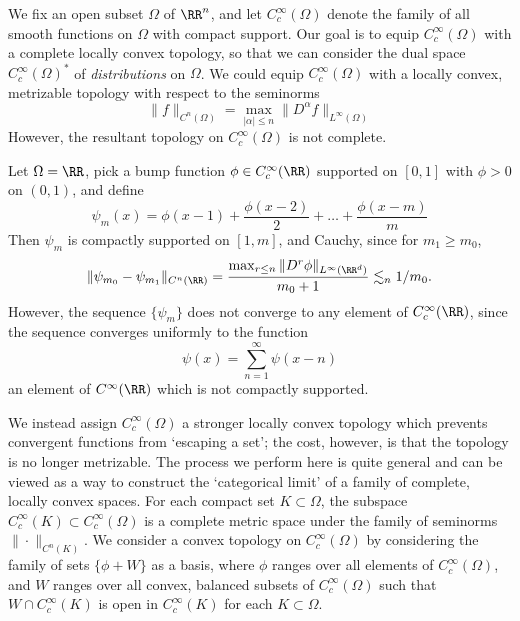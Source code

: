 We fix an open subset $\Omega$ of $\RR^n$, and let $C_c^\infty(\Omega)$ denote the family of all smooth functions on $\Omega$ with compact support. Our goal is to equip $C_c^\infty(\Omega)$ with a complete locally convex topology, so that we can consider the dual space $C_c^\infty(\Omega)^*$ of \emph{distributions} on $\Omega$. We could equip $C_c^\infty(\Omega)$ with a locally convex, metrizable topology with respect to the seminorms
%
\[ \| f \|_{C^n(\Omega)} = \max_{|\alpha| \leq n} \| D^\alpha f \|_{L^\infty(\Omega)} \]
%
However, the resultant topology on $C_c^\infty(\Omega)$ is not complete.

\begin{example}
    Let $\Omega = \RR$, pick a bump function $\phi \in C_c^\infty(\RR)$ supported on $[0,1]$ with $\phi > 0$ on $(0,1)$, and define
    \[ \psi_m(x) = \phi(x-1) + \frac{\phi(x-2)}{2} + \dots + \frac{\phi(x-m)}{m} \]
    Then $\psi_m$ is compactly supported on $[1,m]$, and Cauchy, since for $m_1 \geq m_0$,
    \[ \| \psi_{m_0} - \psi_{m_1} \|_{C^n(\RR)} = \frac{ \max_{r \leq n} \| D^r \phi \|_{L^\infty(\RR^d)}}{m_0+1} \lesssim_n 1/m_0. \]
    However, the sequence $\{ \psi_m \}$ does not converge to any element of $C_c^\infty(\RR)$, since the sequence converges uniformly to the function
    \[ \psi(x) = \sum_{n = 1}^\infty \psi(x-n) \]
    an element of $C^\infty(\RR)$ which is not compactly supported.
\end{example}

We instead assign $C_c^\infty(\Omega)$ a stronger locally convex topology which prevents convergent functions from `escaping a set'; the cost, however, is that the topology is no longer metrizable. The process we perform here is quite general and can be viewed as a way to construct the `categorical limit' of a family of complete, locally convex spaces. For each compact set $K \subset \Omega$, the subspace $C_c^\infty(K) \subset C_c^\infty(\Omega)$ is a complete metric space under the family of seminorms $\| \cdot \|_{C^n(K)}$. We consider a convex topology on $C_c^\infty(\Omega)$ by considering the family of sets $\{ \phi + W \}$ as a basis, where $\phi$ ranges over all elements of $C_c^\infty(\Omega)$, and $W$ ranges over all convex, balanced subsets of $C_c^\infty(\Omega)$ such that $W \cap C_c^\infty(K)$ is open in $C_c^\infty(K)$ for each $K \subset \Omega$.

